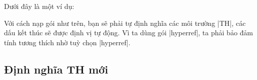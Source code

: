 \documentclass[11pt,oneside]{ltxdoc}
\theoremstyle{marginbreak}
\theoremstyle{changebreak}
\theoremstyle{change}
\theoremstyle{plain}
\theoremstyle{nonumberplain}
\begin{document}
Dưới đây là một ví dụ:
\begin{example}
  \usepackage{hyperref}
  \usepackage[hyperref,thmmarks,noconfig]{ntheorem}
\end{example}
Với cách nạp gói như trên, bạn sẽ phải tự định nghĩa các môi trường |TH|,
các dấu kết thúc sẽ được định vị tự động. Vì ta dùng gói |hyperref|,
ta phải bảo đảm tính tương thích nhờ tuỳ chọn |hyperref|.


\subsection{Định nghĩa TH mới}
\end{document}

